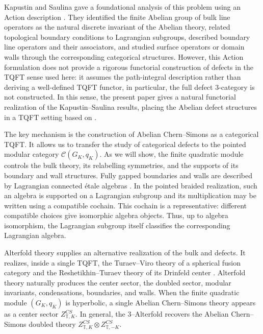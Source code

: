 \documentclass[12pt]{amsart}
\numberwithin{equation}{section}
\theoremstyle{definition}
\begin{document}
Kapustin and Saulina gave a foundational analysis of this problem using an Action description \cite{kapustin2010surface,Kapustin2010}.  They identified the finite Abelian group of bulk line operators as the natural discrete invariant of the Abelian theory, related topological boundary conditions to Lagrangian subgroups, described boundary line operators and their associators, and studied surface operators or domain walls through the corresponding categorical structures.  However, this Action formulation does not provide a rigorous functorial construction of defects in the TQFT sense used here: it assumes the path-integral description rather than deriving a well-defined TQFT functor, in particular, the full defect $3$-category is not constructed.  In this sense, the present paper gives a natural functorial realization of the Kapustin--Saulina results, placing the Abelian defect structures in a TQFT setting based on \cite{Fuchs:2013,CRS2019,CMS2020}.


The key mechanism is the construction of Abelian Chern--Simons as a categorical TQFT. It allows us to transfer the study of categorical defects to the pointed modular category $\mathcal C(G_K,q_K)$.  As we will show, the finite quadratic module controls the bulk theory, its relabelling symmetries, and the supports of its boundary and wall structures.  Fully gapped boundaries and walls are described by Lagrangian connected \'etale algebras \cite{DMNO2013}. In the pointed braided realization, such an algebra is supported on a Lagrangian subgroup and its multiplication may be written using a compatible cochain. This cochain is a representative: different compatible choices give isomorphic algebra objects. Thus, up to algebra isomorphism, the Lagrangian subgroup itself classifies the corresponding Lagrangian algebra.

Alterfold theory supplies an alternative realization of the bulk and defects.  It realizes, inside a single TQFT, the Turaev--Viro theory of a spherical fusion category and the Reshetikhin--Turaev theory of its Drinfeld center \cite{Alterfold1, Alterfold2}.  Alterfold theory naturally produces the center sector, the doubled sector, modular invariants, condensations, boundaries, and walls.  When the finite quadratic module $(G_K,q_K)$ is hyperbolic, a single Abelian Chern--Simons theory appears as a center sector $Z^{CS}_{\mathbb T,K}$. In general, the $3$--Alterfold recovers the Abelian Chern--Simons  doubled theory $Z^{CS}_{\mathbb T,K}\otimes Z^{CS}_{\mathbb T,-K}.$
\end{document}
